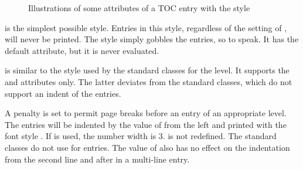 \begin{description}
\begin{figure}
{%
    }
    \caption{Illustrations of some attributes of a TOC entry with the
       style}
    \label{fig:tocbasic.dottedtocline}
  \end{figure}
\item[\PValue{gobble}] is the simplest possible style. Entries in this style,
  regardless of the setting of %
  ,
  will never be printed. The style simply gobbles the
  entries, so to speak. It has the default  attribute, but
  it is never evaluated.
\item[\PValue{largetocline}] is similar to the style used by the standard
  classes for the  level. It supports the  and
   attributes only. The latter deviates from the standard
  classes, which do not support an indent of the  entries.

  A penalty is set to permit page breaks before an entry of an appropriate
  level. The entries will be indented by the value of  from the
  left and printed with the font style . If
   is used, the number width is 3.
   is not redefined. The standard classes
  do not use  for  entries. The
  value of  also has no effect on the indentation from the
  second line and after in a multi-line entry.


\end{description}
